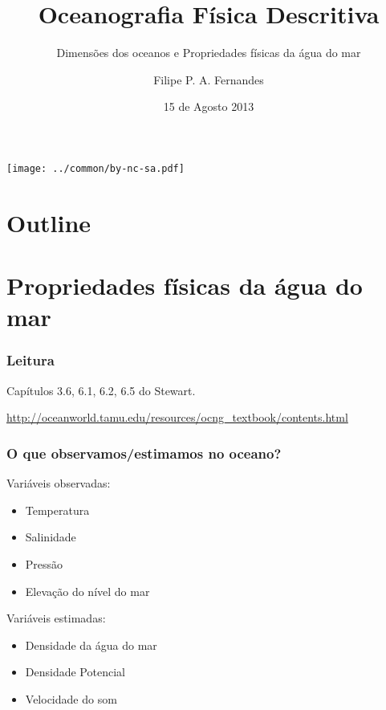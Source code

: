 
\title[Aula 02]{Oceanografia Física Descritiva}
\subtitle{Dimensões dos oceanos e Propriedades físicas da água do mar}
\author[Filipe Fernandes]{Filipe P. A. Fernandes}
\date[Agosto 2013]{15 de Agosto 2013}




\begin{frame}[plain]
  \titlepage
    \begin{center}
    \texttt{[image: ../common/by-nc-sa.pdf]}
  \end{center}
\end{frame}

\section*{Outline}
\begin{frame}
\tableofcontents
\end{frame}


\section{Propriedades físicas da água do mar}
\begin{frame}
\frametitle{Leitura}
    \begin{block}{}
        Capítulos 3.6, 6.1, 6.2, 6.5 do Stewart.

        \small{\url{http://oceanworld.tamu.edu/resources/ocng_textbook/contents.html}}
    \end{block}
\end{frame}

\begin{frame}
\frametitle{O que observamos/estimamos no oceano?}
Variáveis observadas:
    \small{
    {\bf
    \begin{itemize}[<+-| alert@+>]
    \item Temperatura
    \item Salinidade
    \item Pressão
    \item Elevação do nível do mar
    \end{itemize}
    }}
    \pause
Variáveis estimadas:
    \small{
    \begin{itemize}[<+-| alert@+>]
    \item Densidade da água do mar
    \item Densidade Potencial
    \item Velocidade do som
    \end{itemize}
    }
\end{frame}

